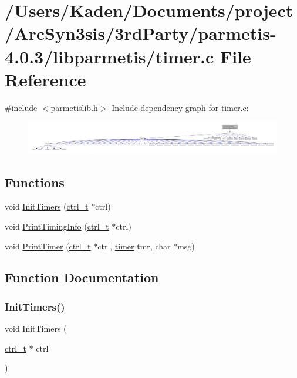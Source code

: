 \hypertarget{a00410}{}\section{/\+Users/\+Kaden/\+Documents/project/\+Arc\+Syn3sis/3rd\+Party/parmetis-\/4.0.3/libparmetis/timer.c File Reference}
\label{a00410}
{\ttfamily \#include $<$parmetislib.\+h$>$}\newline
Include dependency graph for timer.\+c\+:\nopagebreak
\begin{figure}[H]
\begin{center}
\leavevmode
\includegraphics[width=350pt]{a00411}
\end{center}
\end{figure}
\subsection*{Functions}
\begin{DoxyCompactItemize}
\item 
void \hyperlink{a00410_a09eb39c46e7048dd595e0350f2077ed8}{Init\+Timers} (\hyperlink{a00742}{ctrl\+\_\+t} $\ast$ctrl)
\item 
void \hyperlink{a00410_a113145fbd769a6debc03adaed0f0d288}{Print\+Timing\+Info} (\hyperlink{a00742}{ctrl\+\_\+t} $\ast$ctrl)
\item 
void \hyperlink{a00410_aecefd5c0515e1de34636548bc2851554}{Print\+Timer} (\hyperlink{a00742}{ctrl\+\_\+t} $\ast$ctrl, \hyperlink{a00978_aae821c36bb7e6918e1414484f939c3d4}{timer} tmr, char $\ast$msg)
\end{DoxyCompactItemize}


\subsection{Function Documentation}
\mbox{\label{a00410_a09eb39c46e7048dd595e0350f2077ed8}} 
\subsubsection{\texorpdfstring{Init\+Timers()}{InitTimers()}}
{\footnotesize\ttfamily void Init\+Timers (\begin{DoxyParamCaption}\item[{\hyperlink{a00742}{ctrl\+\_\+t} $\ast$}]{ctrl }\end{DoxyParamCaption})}


